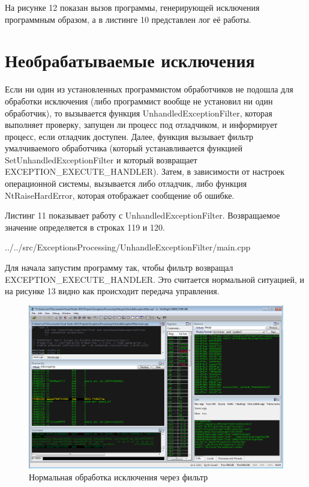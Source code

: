 \documentclass[a4paper, 12pt]{report}		%
\begin{document}
На рисунке 12 показан вызов программы, генерирующей исключения программным образом, а в листинге 10 представлен лог её работы.




\chapter*{Необрабатываемые исключения}

Если ни один из установленных программистом обработчиков не подошла для обработки исключения (либо программист вообще не установил ни один обработчик), то вызывается функция UnhandledExceptionFilter, которая выполняет проверку, запущен ли процесс под отладчиком, и информирует процесс, если отладчик доступен. Далее, функция вызывает фильтр умалчиваемого обработчика (который устанавливается функцией SetUnhandledExceptionFilter и который возвращает EXCEPTION\_EXECUTE\_HANDLER). Затем, в зависимости от настроек операционной системы, вызывается либо отладчик, либо функция NtRaiseHardError, которая отображает сообщение об ошибке. 

Листинг 11 показывает работу с UnhandledExceptionFilter. Возвращаемое значение определяется в строках 119 и 120.


{../../src/ExceptionsProcessing/UnhandleExceptionFilter/main.cpp}

Для начала запустим программу так, чтобы фильтр возвращал EXCEPTION\_EXECUTE\_HANDLER. Это считается нормальной ситуацией, и на рисунке 13 видно как происходит передача управления.

\begin{figure}[h!]
\centering
\includegraphics[scale=0.5]{res/006}
\caption{Нормальная обработка исключения через фильтр}
\end{figure}
\end{document}
